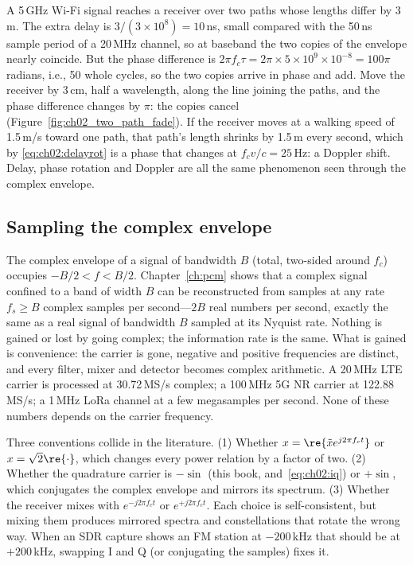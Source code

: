 \begin{worked}
A 5\,GHz Wi-Fi signal reaches a receiver over two paths whose lengths differ by 3\,m. The extra
delay is $3/(3\times10^8)=10$\,ns, small compared with the 50\,ns sample period of a 20\,MHz channel,
so at baseband the two copies of the envelope nearly coincide. But the phase difference is
$2\pi f_c\tau=2\pi\times5\times10^9\times10^{-8}=100\pi$ radians, i.e., 50 whole cycles, so the two
copies arrive in phase and add. Move the receiver by 3\,cm, half a wavelength, along the line joining
the paths, and the phase difference changes by $\pi$: the copies cancel
(Figure~\ref{fig:ch02_two_path_fade}). If the receiver moves at a walking speed of 1.5\,m/s toward one
path, that path's length shrinks by 1.5\,m every second, which by \eqref{eq:ch02:delayrot} is a phase
that changes at $f_c v/c=25$\,Hz: a Doppler shift. Delay, phase rotation and Doppler are all the same
phenomenon seen through the complex envelope.
\end{worked}

\subsection{Sampling the complex envelope}

The complex envelope of a signal of bandwidth $B$ (total, two-sided around $f_c$) occupies
$-B/2<f<B/2$. Chapter~\ref{ch:pcm} shows that a complex signal confined to a band of width $B$ can be
reconstructed from samples at any rate $f_s\ge B$ complex samples per second---$2B$ real numbers per
second, exactly the same as a real signal of bandwidth $B$ sampled at its Nyquist rate. Nothing is
gained or lost by going complex; the information rate is the same. What is gained is convenience: the
carrier is gone, negative and positive frequencies are distinct, and every filter, mixer and detector
becomes complex arithmetic. A 20\,MHz LTE carrier is processed at 30.72\,MS/s complex; a 100\,MHz
5G NR carrier at 122.88\,MS/s; a 1\,MHz LoRa channel at a few megasamples per second. None of these
numbers depends on the carrier frequency.

\begin{pitfall}
Three conventions collide in the literature. (1) Whether $x=\re\{\tilde xe^{j2\pi f_ct}\}$ or
$x=\sqrt2\re\{\cdot\}$, which changes every power relation by a factor of two. (2) Whether the
quadrature carrier is $-\sin$ (this book, and~\eqref{eq:ch02:iq}) or $+\sin$, which conjugates the
complex envelope and mirrors its spectrum. (3) Whether the receiver mixes with $e^{-j2\pi f_ct}$ or
$e^{+j2\pi f_ct}$. Each choice is self-consistent, but mixing them produces mirrored spectra and
constellations that rotate the wrong way. When an SDR capture shows an FM station at $-200$\,kHz
that should be at $+200$\,kHz, swapping I and Q (or conjugating the samples) fixes it.
\end{pitfall}

